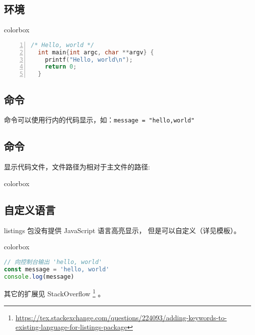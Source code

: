 \subsection{\protect{} 环境}

\begin{latexcode}{colorbox}
\begin{lstlisting}[language=C,caption={C/C++ 语言},numbers=left]
  /* Hello, world */
  int main{int argc, char **argv} {
    printf("Hello, world\n");
    return 0;
  }
\end{lstlisting}
\end{latexcode}

\subsection{\protect{} 命令}

 命令可以使用行内的代码显示，如：\texttt{\lstinline|message = "hello,world"|}

\subsection{\protect{} 命令}

显示代码文件，文件路径为相对于主文件的路径:

\begin{latexcode}{colorbox}

\end{latexcode}

\subsection{自定义语言}

listings 包没有提供 JavaScript 语言高亮显示， 但是可以自定义（详见模板）。

\begin{latexcode}{colorbox}
\begin{lstlisting}[language=js,caption={JavaScript 语言}]
// 向控制台输出 'hello, world'
const message = 'hello, world'
console.log(message)
\end{lstlisting}
\end{latexcode}

其它的扩展见 StackOverflow
\footnote{\url{https://tex.stackexchange.com/questions/224093/adding-keywords-to-existing-language-for-listings-package}}
。

